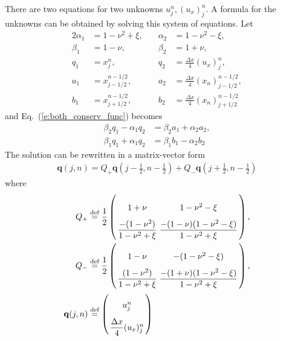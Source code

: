 \documentclass[11pt,dvips]{article}
\numberwithin{equation}{section}
\newcommand{\defeq}{\ensuremath{\buildrel {\text{def}}\over{=}}}
\begin{document}
There are two equations for two unknowns $u_j^n, (u_x)_j^n$.  A formula for the
unknowns can be obtained by solving this system of equations.  Let
\begin{alignat*}{2}
  \alpha_1 &= 1-\nu^2+\xi,\quad &\alpha_2 &= 1-\nu^2-\xi, \\
  \beta_1 &= 1-\nu, &\beta_2 &= 1+\nu, \\
  q_1 &= x_j^n, &q_2 &= \frac{\Delta x}{4}(u_x)_j^n, \\
  a_1 &= x_{j-1/2}^{n-1/2},
 &a_2 &= \frac{\Delta x}{4}(x_n)_{j-1/2}^{n-1/2}, \\
  b_1 &= x_{j+1/2}^{n-1/2},
 &b_2 &= \frac{\Delta x}{4}(x_n)_{j+1/2}^{n-1/2}
\end{alignat*}
and Eq.~(\ref{e:both_conserv_func}) becomes
\begin{align*}
  \beta_2q_1 - \alpha_1q_2 &= \beta_2a_1 + \alpha_2a_2, \\
  \beta_1q_1 + \alpha_1q_2 &= \beta_1b_1 - \alpha_2b_2
\end{align*}
The solution can be rewritten in a matrix-vector form
\begin{align*}
  \mathbf{q}(j,n) =
    Q_+\mathbf{q}(j-\frac{1}{2},n-\frac{1}{2})
  + Q_-\mathbf{q}(j+\frac{1}{2},n-\frac{1}{2})
\end{align*}
where
\begin{align*}
  Q_+ &\defeq
    \frac{1}{2}
    \left(
    \arraycolsep=1.4pt\def\arraystretch{2.2}
    \begin{array}{cc}
      1+\nu                                     &
      1-\nu^2-\xi                               \\
      \dfrac{-(1-\nu^2)}{1-\nu^2+\xi}            &
      \dfrac{-(1-\nu)(1-\nu^2-\xi)}{1-\nu^2+\xi}
    \end{array}\right), \\
  Q_- &\defeq
    \frac{1}{2}
    \left(
    \arraycolsep=1.4pt\def\arraystretch{2.2}
    \begin{array}{cc}
      1-\nu                                     &
      -(1-\nu^2-\xi)                            \\
      \dfrac{(1-\nu^2)}{1-\nu^2+\xi}             &
      \dfrac{-(1+\nu)(1-\nu^2-\xi)}{1-\nu^2+\xi}
    \end{array}\right), \\
  \mathbf{q}(j,n) &\defeq
    \left(
    \arraycolsep=1.4pt\def\arraystretch{2.2}
    \begin{array}{c}
      u_j^n \\ \dfrac{\Delta x}{4}(u_x)_j^n
    \end{array}\right)
\end{align*}
\end{document}
